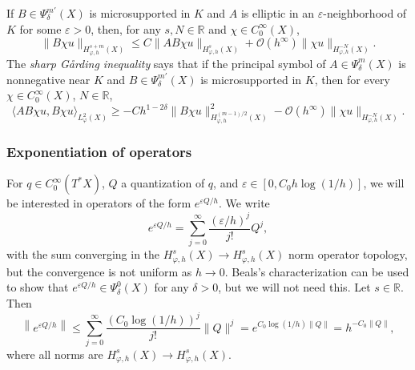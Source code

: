 \documentclass[reqno, 12pt]{amsart}
\newcommand \N {\mathbb{N}}
\newcommand \R {\mathbb{R}}
\newcommand \Oh {\mathcal{O}}
\newcommand \la {\langle}
\newcommand \ra {\rangle}
\newcommand \eps {\varepsilon}
\theoremstyle{definition}
\numberwithin{equation}{section}
\numberwithin{prop}{section}
\numberwithin{figure}{section}
\begin{document}
If $B \in \Psi^{m'}_\delta(X)$ is microsupported in $K$ and $A$ is elliptic in an $\eps$-neighborhood of $K$ for some $\eps > 0$, then, for any $s,N \in \R$ and $\chi \in C_0^\infty(X)$,
\begin{equation}\label{ellipestx} \|B\chi u\|_{H^{s+m}_{\varphi,h}(X)} \le C \|AB \chi u\|_{H^{s}_{\varphi,h}(X)} + \Oh(h^\infty)\|\chi u\|_{H^{-N}_{\varphi,h}(X)}.\end{equation}
The \textit{sharp G\aa rding inequality}  says that if the principal symbol of $A \in \Psi_\delta^m(X)$ is nonnegative near $K$ and $B \in \Psi_\delta^{m'}(X)$ is microsupported in $K$, then for every $\chi \in C_0^\infty(X)$, $N \in \R$,
\begin{equation}\label{gardingx}\la A B \chi u, B \chi u \ra_{L^2_{\varphi}(X)} \ge -Ch^{1-2\delta} \|B \chi u\|^2_{H^{(m-1)/2}_{\varphi,h}(X)} - \Oh(h^\infty)\|\chi u\|_{H^{-N}_{\varphi,h}(X)}.\end{equation}

\subsubsection{Exponentiation of operators}\label{expop} For $q \in C_0^\infty(T^*X)$, $Q$ a quantization of $q$, and $\eps \in[0,C_0 h\log(1/h)]$, we will be interested in operators of the form $e^{\eps Q/h}$.  We write
\[e^{\eps Q/h} = \sum_{j=0}^\infty \frac {(\eps/h)^j}{j!} Q^j,\]
with the sum converging in the $H^s_{\varphi,h}(X) \to H^s_{\varphi,h}(X)$ norm operator topology, but the convergence is not uniform as $h \to 0$.  Beals's characterization  \cite[Theorem 9.12]{ez} can be used to show that $e^{\eps Q/h} \in \Psi^{0}_\delta(X)$ for any $\delta>0$, but we will not need this. Let $s \in \R$. Then
\begin{equation}\label{e:expest}
\left\|e^{\eps Q/h}\right\| \le \sum_{j=0}^\infty \frac{(C_0\log(1/h))^j}{j!} \|Q\|^j = e^{C_0 \log(1/h)\|Q\|} = h^{-C_0 \|Q\|},
\end{equation}
where all norms are $H^s_{\varphi,h}(X) \to H^s_{\varphi,h}(X)$.
\end{document}

